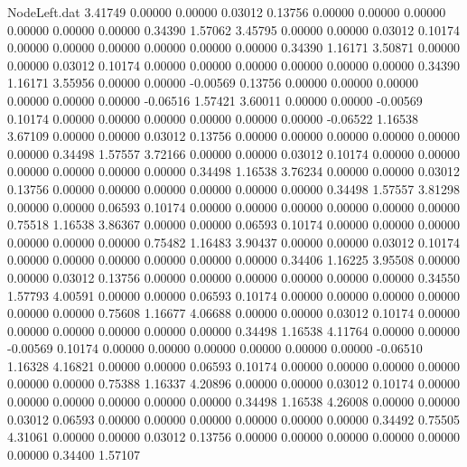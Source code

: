 \begin{filecontents}{NodeLeft.dat}
   3.41749    0.00000    0.00000     0.03012    0.13756    0.00000    0.00000    0.00000    0.00000    0.00000    0.00000    0.34390    1.57062
   3.45795    0.00000    0.00000     0.03012    0.10174    0.00000    0.00000    0.00000    0.00000    0.00000    0.00000    0.34390    1.16171
   3.50871    0.00000    0.00000     0.03012    0.10174    0.00000    0.00000    0.00000    0.00000    0.00000    0.00000    0.34390    1.16171
   3.55956    0.00000    0.00000    -0.00569    0.13756    0.00000    0.00000    0.00000    0.00000    0.00000    0.00000   -0.06516    1.57421
   3.60011    0.00000    0.00000    -0.00569    0.10174    0.00000    0.00000    0.00000    0.00000    0.00000    0.00000   -0.06522    1.16538
   3.67109    0.00000    0.00000     0.03012    0.13756    0.00000    0.00000    0.00000    0.00000    0.00000    0.00000    0.34498    1.57557
   3.72166    0.00000    0.00000     0.03012    0.10174    0.00000    0.00000    0.00000    0.00000    0.00000    0.00000    0.34498    1.16538
   3.76234    0.00000    0.00000     0.03012    0.13756    0.00000    0.00000    0.00000    0.00000    0.00000    0.00000    0.34498    1.57557
   3.81298    0.00000    0.00000     0.06593    0.10174    0.00000    0.00000    0.00000    0.00000    0.00000    0.00000    0.75518    1.16538
   3.86367    0.00000    0.00000     0.06593    0.10174    0.00000    0.00000    0.00000    0.00000    0.00000    0.00000    0.75482    1.16483
   3.90437    0.00000    0.00000     0.03012    0.10174    0.00000    0.00000    0.00000    0.00000    0.00000    0.00000    0.34406    1.16225
   3.95508    0.00000    0.00000     0.03012    0.13756    0.00000    0.00000    0.00000    0.00000    0.00000    0.00000    0.34550    1.57793
   4.00591    0.00000    0.00000     0.06593    0.10174    0.00000    0.00000    0.00000    0.00000    0.00000    0.00000    0.75608    1.16677
   4.06688    0.00000    0.00000     0.03012    0.10174    0.00000    0.00000    0.00000    0.00000    0.00000    0.00000    0.34498    1.16538
   4.11764    0.00000    0.00000    -0.00569    0.10174    0.00000    0.00000    0.00000    0.00000    0.00000    0.00000   -0.06510    1.16328
   4.16821    0.00000    0.00000     0.06593    0.10174    0.00000    0.00000    0.00000    0.00000    0.00000    0.00000    0.75388    1.16337
   4.20896    0.00000    0.00000     0.03012    0.10174    0.00000    0.00000    0.00000    0.00000    0.00000    0.00000    0.34498    1.16538
   4.26008    0.00000    0.00000     0.03012    0.06593    0.00000    0.00000    0.00000    0.00000    0.00000    0.00000    0.34492    0.75505
   4.31061    0.00000    0.00000     0.03012    0.13756    0.00000    0.00000    0.00000    0.00000    0.00000    0.00000    0.34400    1.57107

\end{filecontents}
